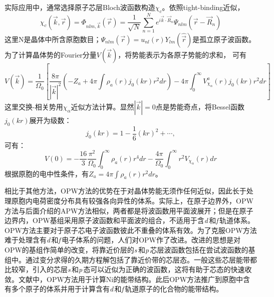 实际应用中，通常选择原子芯层Bloch波函数构造$\chi_c$。依照tight-binding近似\cite{Huang-Han}，
$$\chi_c(\vec k,\vec r)=\Phi_{nlm,\vec k}(\vec r)=\frac1{\sqrt N}\sum_{n=1}^Ne^{i\vec k\cdot\vec R_n}\Psi_{nlm}(\vec r-\vec R_n)$$
这里N是晶体中所含原胞数目；$\Psi_{nlm}(\vec r)=u_{nl}(r)Y_{lm}(\hat{\vec r})$是孤立原子波函数。为了计算晶体势的Fourier分量$V(\vec k)$，将势能表示为各原子势能的求和，%
可有\cite{Euwema-Stukel-Collins}
\begin{equation}
  V(\vec k)=\frac1{\Omega_0}\left[\frac{8\pi}{|\vec k|^2}\left(-Z_a+4\pi\int\rho_a(r)j_0(kr)r^2dr\right)-4\pi\int_0^{\infty}V_{\chi_{\alpha}}^a(r)j_0(kr)r^2dr\right]
  \label{eq:solid-87}
\end{equation}
这里交换-相关势用$\chi_\alpha$近似方法计算。显然$|\vec k|=0$点是势能奇点，将Bessel函数$j_0(kr)$展开为级数：
$$j_0(kr)=1-\frac16(kr)^2+\cdots,$$可有：
\begin{equation}
  V(0)=-\frac{16}3\frac{\pi^2}{\Omega_0}\int_0^{\infty}\rho_a(r)r^4dr-\frac{4\pi}{\Omega_0}\int_0^{\infty}r^2V_{\chi_{\alpha}}(r)dr
  \label{eq:solid-88}
\end{equation}
根据原胞的电中性条件，有$Z_a=4\pi\int\rho_a(r)r^2dr$。

相比于其他方法，OPW方法的优势在于对晶体势能无须作任何近似，因此长于处理原胞内电荷密度分布具有较强各向异性的体系。实际上，在原子边界外，OPW方法与后面介绍的APW方法相似，两者都是将波函数用平面波展开；但是在原子边界内，OPW基组采用原子波函数和平面波的组合，不适用于含{\it d}\,和{\it f}\,轨道体系。OPW方法主要对于原子芯电子波函数彼此不重叠的体系有效。为了克服OPW方法难于处理含有{\it d}\,和{\it f}\,电子体系的问题，人们对OPW作了改进\cite{PR57-1169_1940,PR99-500_1955}。改进的思想是对OPW的基组作简单的改变，将靠近价层的{\it s}\,和{\it p}\,芯层波函数包括在尝试波函数的基组中。通过变分求得的久期方程解包括了靠近价带的芯层态。一般这些芯层能带都比较窄，引入的芯层{\it s}\,和{\it p}\,态可以近似为正确的波函数，这将有助于芯态的快速收敛。文献中，OPW方法用于计算Ni的能带结构。此后OPW方法推广到原胞中含有多个原子的体系并用于计算含有{\it d}\,和{\it f}\,轨道原子的化合物的能带结构\cite{PSSB94-51_1979,PSSB97-631_1980}。


